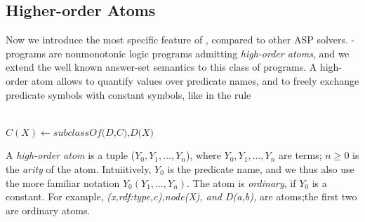\documentclass[a4paper, titlepage]{article}
\begin{document}
\subsection{Higher-order Atoms}
Now we introduce the most specific feature of \dlvhex{}, 
compared to other ASP solvers. \hex{}-programs are 
nonmonotonic logic programs admitting \emph{high-order 
atoms}, and we extend the well known answer-set semantics 
to this class of programs. A high-order 
atom allows to quantify values over predicate names, and to 
freely exchange predicate symbols with constant symbols, 
like in the rule\\ \centerline{\\$C(X) \leftarrow 
\textit{subclassOf(D,C),D(X)}$}
A \textit{high-order atom} is a tuple ($Y_0, Y_1,
\dots,Y_n$), where $Y_0, Y_1,\dots,Y_n$ are terms; $ n \ge 
0$ is the \textit{arity} of the atom. Intuiitively, $Y_0$ 
is the predicate name, and we thus also use the more 
familiar notation $Y_0(Y_1,\dots,Y_n)$. The atom is 
\textit{ordinary}, if $Y_0$ is a constant. For example, 
\textit{(x,rdf:type,c),node(X), and D(a,b),} are atoms;the 
first two are ordinary atoms.
\end{document}
